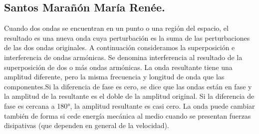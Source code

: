 \documentclass[10pt]{article}
\begin{document}
\begin{multicols}{2}
\subsection*{Santos Marañón María Renée.}
Cuando dos ondas se encuentran en un punto o una región del espacio, el resultado es una nueva onda cuya perturbación es la suma de las perturbaciones de las dos ondas originales. A continuación consideramos la superposición e interferencia de ondas armónicas. Se denomina interferencia al resultado de la superposición de dos o más ondas armónicas.  La onda resultante tiene una amplitud diferente, pero la misma frecuencia y 
longitud de onda que las componentes.Si la diferencia de fase es cero, se dice que las ondas están en fase y la
amplitud de la resultante es el doble de la amplitud original.
Si la diferencia de fase es cercana a 180°, la amplitud resultante es casi cero. La onda puede cambiar también de forma si cede energía mecánica al 
medio cuando se presentan fuerzas disipativas (que dependen en general 
de la velocidad).


\end{multicols}
\end{document}
